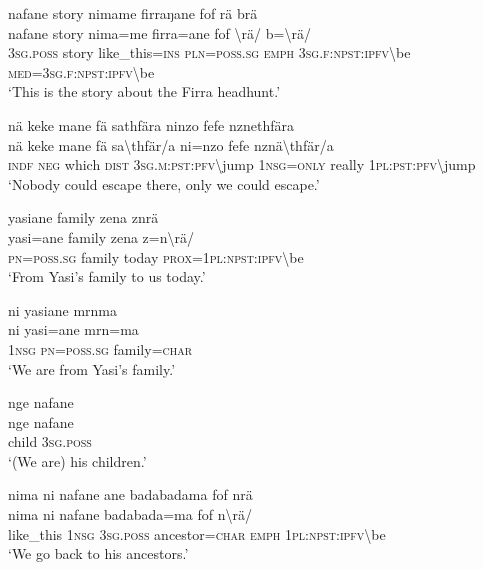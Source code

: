 \ea\label{ex:4:a1804}
nafane story nimame firraŋane fof rä brä\\
\gll nafane	story	nima=me	firra=ane	fof	{\textbackslash}rä/	b={\textbackslash}rä/\\
     3\textsc{sg}.\textsc{poss}	story	like\_this=\textsc{ins}	\textsc{pln}=\textsc{poss}.\textsc{sg}	\textsc{emph}	3\textsc{sg}.\textsc{f}:\textsc{npst}:\textsc{ipfv}{\textbackslash}be	\textsc{med}=3\textsc{sg}.\textsc{f}:\textsc{npst}:\textsc{ipfv}{\textbackslash}be\\
\glt `This is the story about the Firra headhunt.'
\z

\ea\label{ex:4:a1805}
nä keke mane fä sathfära ninzo fefe nznethfära\\
\gll nä	keke	mane	fä	sa{\textbackslash}thfär/a	ni=nzo	fefe	nznä{\textbackslash}thfär/a\\
     \textsc{indf}	\textsc{neg}	which	\textsc{dist}	3\textsc{sg}.\textsc{m}:\textsc{pst}:\textsc{pfv}{\textbackslash}jump	1\textsc{nsg}=\textsc{only}	really	1\textsc{pl}:\textsc{pst}:\textsc{pfv}{\textbackslash}jump\\
\glt `Nobody could escape there, only we could escape.'
\z

\ea\label{ex:4:a1806}
yasiane family zena znrä\\
\gll yasi=ane	family	zena	z=n{\textbackslash}rä/\\
     \textsc{pn}=\textsc{poss}.\textsc{sg}	family	today	\textsc{prox}=1\textsc{pl}:\textsc{npst}:\textsc{ipfv}{\textbackslash}be\\
\glt `From Yasi's family to us today.'
\z

\ea\label{ex:4:a1807}
ni yasiane mrnma\\
\gll ni	yasi=ane	mrn=ma\\
     1\textsc{nsg}	\textsc{pn}=\textsc{poss}.\textsc{sg}	family=\textsc{char}\\
\glt `We are from Yasi's family.'
\z

\ea\label{ex:4:a1808}
nge nafane\\
\gll nge	nafane\\
     child	3\textsc{sg}.\textsc{poss}\\
\glt `(We are) his children.'
\z

\ea\label{ex:4:a1809}
nima ni nafane ane badabadama fof nrä\\
\gll nima	ni	nafane	badabada=ma	fof	n{\textbackslash}rä/\\
     like\_this	1\textsc{nsg}	3\textsc{sg}.\textsc{poss}	ancestor=\textsc{char}	\textsc{emph}	1\textsc{pl}:\textsc{npst}:\textsc{ipfv}{\textbackslash}be\\
\glt `We go back to his ancestors.'
\z


